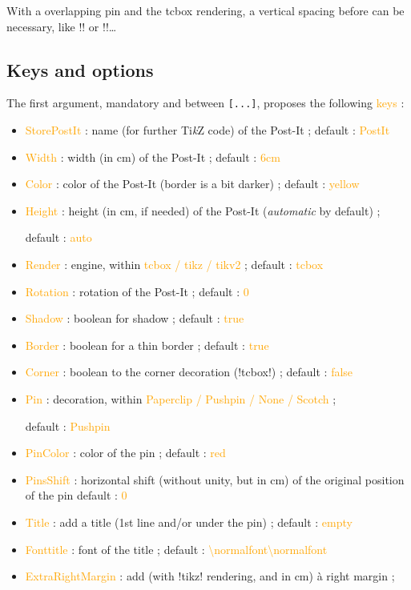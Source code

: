 \documentclass[english,a4paper,11pt]{article}
\providecommand\tikzlogo{Ti\textit{k}Z}
\let\TikZ\tikzlogo
\newcommand\Cle[1]{{\small\sffamily\textlangle \textcolor{orange}{#1}\textrangle}}
\newcommand\cmaj[1]{\tcbox[vignetteMaJ]{#1}\xspace}
\begin{document}
\begin{warningblock}
With a overlapping pin and the \textsf{tcbox} rendering, a vertical spacing before can be necessary, like \motcletex!\vspace! or \motcletex!\bigskip!\ldots
\end{warningblock}

\subsection{Keys and options}

\begin{tipblock}
The first argument, mandatory and between \texttt{[...]}, proposes the following \Cle{keys} :

\begin{itemize}
	\item \cmaj{0.1.3} \Cle{StorePostIt} : name (for further \TikZ{} code) of the Post-It ; \hfill{}default : \Cle{PostIt}
	\item \Cle{Width} : width (in cm) of the Post-It  ; \hfill{}default : \Cle{6cm}
	\item \Cle{Color} : color of the Post-It (border is a bit darker) ; \hfill{}default : \Cle{yellow}
	\item \Cle{Height} : height (in cm, if needed) of the Post-It (\textit{automatic} by default) ;
	
	\hfill{}default : \Cle{auto}
	\item \cmaj{0.1.1} \Cle{Render} : engine, within \Cle{tcbox / tikz / tikv2} ; \hfill{}default : \Cle{tcbox}
	\item \Cle{Rotation} : rotation of the Post-It ; \hfill{}default : \Cle{0}
	\item \Cle{Shadow} : boolean for shadow ; \hfill{}default : \Cle{true}
	\item \Cle{Border} : boolean for a thin border ; \hfill{}default : \Cle{true}
	\item \Cle{Corner} : boolean to the corner decoration (\motcletex!tcbox!) ; \hfill{}default : \Cle{false}
	\item \Cle{Pin} : decoration, within \Cle{Paperclip / Pushpin / None / Scotch} ;
	
	\hfill{}default : \Cle{Pushpin}
	\item \Cle{PinColor} : color of the pin ; \hfill{}default : \Cle{red}
	\item \Cle{PinsShift} : horizontal shift (without unity, but in cm) of the original position of the pin \hfill{}default : \Cle{0}
	\item \cmaj{0.1.1} \Cle{Title} : add a title (1st line and/or under the pin) ; \hfill{}default : \Cle{empty}
	\item \cmaj{0.1.1} \Cle{Fonttitle} : font of the title ; \hfill{}default : \Cle{\textbackslash normalfont\textbackslash normalfont}
	\item \cmaj{0.1.1} \Cle{ExtraRightMargin} : add (with \packagetex!tikz! rendering, and in cm) à right margin ;
	

\end{itemize}
\end{tipblock}
\end{document}
